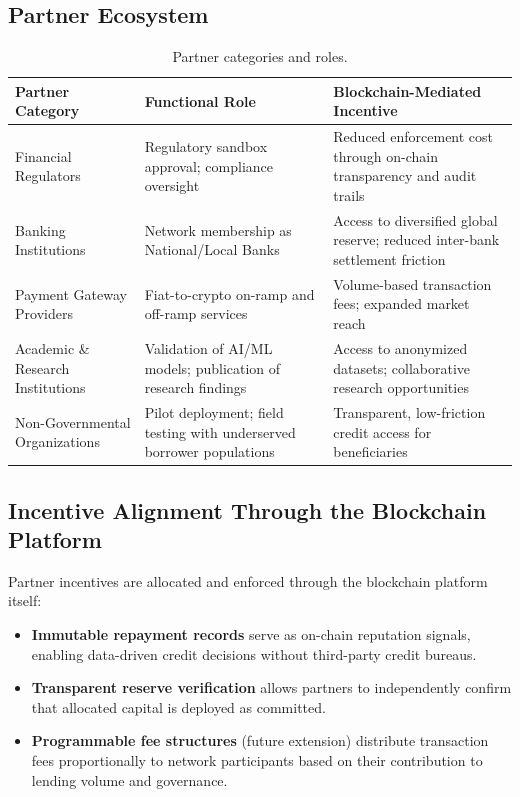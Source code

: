 \documentclass[12pt,a4paper]{report}
\newcommand{\tableheadfont}{\bfseries\small\color{PrimaryBlue}}
\newenvironment{moderntable}[1][H]{%
    \begin{table}[#1]\centering\small%
    \renewcommand{\arraystretch}{1.35}%
}{%
    \end{table}%
}
\begin{document}
\subsection{Partner Ecosystem}

\begin{moderntable}
\caption{Partner categories and roles.}
\begin{tabular}{@{} >{\raggedright}p{3.2cm} >{\raggedright}p{4.2cm} >{\raggedright\arraybackslash}p{4.6cm} @{}}
\toprule
\tableheadfont Partner Category & \tableheadfont Functional Role & \tableheadfont Blockchain-Mediated Incentive \\
\midrule
\rowcolor{RowShade}
Financial Regulators & Regulatory sandbox approval; compliance oversight & Reduced enforcement cost through on-chain transparency and audit trails \\
Banking Institutions & Network membership as National/Local Banks & Access to diversified global reserve; reduced inter-bank settlement friction \\
\rowcolor{RowShade}
Payment Gateway Providers & Fiat-to-crypto on-ramp and off-ramp services & Volume-based transaction fees; expanded market reach \\
Academic \& Research Institutions & Validation of AI/ML models; publication of research findings & Access to anonymized datasets; collaborative research opportunities \\
\rowcolor{RowShade}
Non-Governmental Organizations & Pilot deployment; field testing with underserved borrower populations & Transparent, low-friction credit access for beneficiaries \\
\bottomrule
\end{tabular}
\end{moderntable}

\subsection{Incentive Alignment Through the Blockchain Platform}

Partner incentives are allocated and enforced through the blockchain platform itself:

\begin{itemize}[noitemsep]
\item \textbf{Immutable repayment records} serve as on-chain reputation signals, enabling data-driven credit decisions without third-party credit bureaus.
\item \textbf{Transparent reserve verification} allows partners to independently confirm that allocated capital is deployed as committed.
\item \textbf{Programmable fee structures} (future extension) distribute transaction fees proportionally to network participants based on their contribution to lending volume and governance.
\end{itemize}
\end{document}
